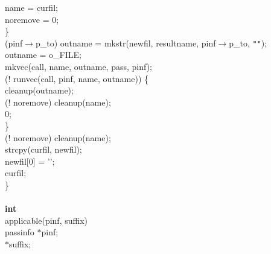 \begin{flushleft}
\hspace*{6\indentation}name = curfil;\mbox{}\\
\hspace*{6\indentation}noremove = 0;\mbox{}\\
\hspace*{3\indentation}\}\mbox{}\\
\hspace*{3\indentation}{\bf if} (pinf$\rightarrow$p\_to) outname = mkstr(newfil, resultname, pinf$\rightarrow$p\_to, {\tt""});\mbox{}\\
\hspace*{3\indentation}{\bf else} outname = o\_FILE;\mbox{}\\
\hspace*{3\indentation}mkvec(call, name, outname, pass, pinf);\mbox{}\\
\hspace*{3\indentation}{\bf if} (! runvec(call, pinf, name, outname)) \{\mbox{}\\
\hspace*{6\indentation}cleanup(outname);\mbox{}\\
\hspace*{6\indentation}{\bf if} (! noremove) cleanup(name);\mbox{}\\
\hspace*{6\indentation}{\bf return} 0;\mbox{}\\
\hspace*{3\indentation}\}\mbox{}\\
\hspace*{3\indentation}{\bf if} (! noremove) cleanup(name);\mbox{}\\
\hspace*{3\indentation}strcpy(curfil, newfil);\mbox{}\\
\hspace*{3\indentation}newfil[0] = '\0';\mbox{}\\
\hspace*{3\indentation}{\bf return} curfil;\mbox{}\\
\}\mbox{}\\
\mbox{}\\
{\bf int}\mbox{}\\
applicable(pinf, suffix)\mbox{}\\
\hspace*{3\indentation}{\bf struct} passinfo $\ast$pinf;\mbox{}\\
\hspace*{3\indentation}{\bf char} $\ast$suffix;\mbox{}\\

\end{flushleft}
